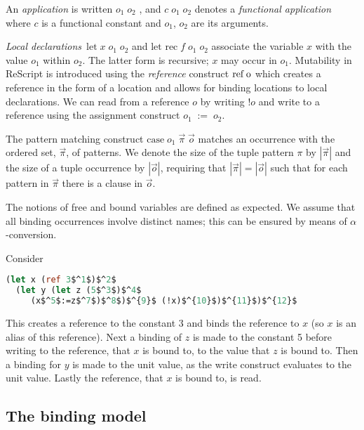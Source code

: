 \documentclass{llncs}
\begin{document}
An \emph{application} is written $o_1\;o_2$ , and $c\;o_1\;o_2$ denotes a
\emph{functional application} where $c$ is a functional constant and
$o_1$, $o_2$ are its arguments.

\emph{Local declarations} $\mbox{let} \; x \; o_1 \; o_2$ and
$\mbox{let rec} \; f \; o_1 \; o_2$ associate the variable $x$ with
the value $o_1$ within $o_2$.  The latter form is recursive; $x$ may
occur in $o_1$. Mutability in ReScript is introduced using the
\emph{reference} construct $\mbox{ref\;o}$ which creates a
reference in the form of a location and allows for binding locations
to local declarations. We can read from a reference $o$ by writing
$!o$ and write to a reference using the assignment construct
$o_1\;:=\;o_2$.

The pattern matching construct
$\mbox{case} \; o_1 \; \vec{\pi} \; \vec{o}$ matches an occurrence
with the ordered set, $\vec{\pi}$, of patterns.  We denote the size of
the tuple pattern $\pi$ by $|\vec{\pi}|$ and the size of a tuple
occurrence by $|\vec{o}|$, requiring that $|\vec{\pi}| = |\vec{o}|$
such that for each pattern in $\vec{\pi}$ there is a clause in
$\vec{o}$.

The notions of free and bound variables are defined as expected. We
assume that all binding occurrences involve distinct names; this can
be ensured by means of $\alpha$-conversion.

\begin{example}\label{ex:write}
Consider
\begin{lstlisting}[language=Caml, mathescape=true]
  (let x (ref 3$^1$)$^2$
  (let y (let z (5$^3$)$^4$
     (x$^5$:=z$^7$)$^8$)$^{9}$ (!x)$^{10}$)$^{11}$)$^{12}$
\end{lstlisting}
This creates a reference to the constant 3 and binds the reference to
$x$ (so $x$ is an alias of this reference). Next a binding of $z$ is made
to the constant 5 before writing to the reference, that $x$ is bound to, 
to the value that $z$ is bound to. Then a binding for $y$ is made to the unit value,
as the write construct evaluates to the unit value. Lastly the reference, that $x$ is bound to, is read.

\end{example}

\subsection{The binding model}\label{sec:EnvSto}
\end{document}
